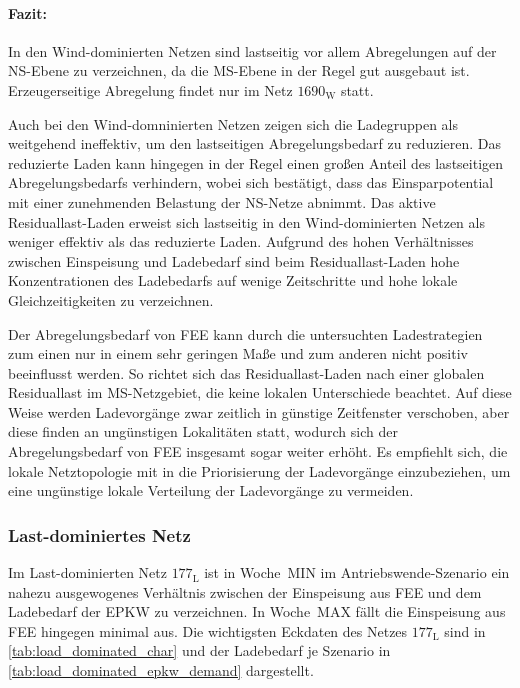 \paragraph{Fazit:}

In den Wind-dominierten Netzen sind lastseitig vor allem Abregelungen auf der \gls{NS}-Ebene zu verzeichnen, da die \gls{MS}-Ebene in der Regel gut ausgebaut ist.
Erzeugerseitige Abregelung findet nur im Netz \(1690_{\text{W}}\) statt.\medskip

Auch bei den Wind-domninierten Netzen zeigen sich die Ladegruppen als weitgehend ineffektiv, um den lastseitigen Abregelungsbedarf zu reduzieren.
Das reduzierte Laden kann hingegen in der Regel einen großen Anteil des lastseitigen Abregelungsbedarfs verhindern, wobei sich bestätigt, dass das Einsparpotential mit einer zunehmenden Belastung der \gls{NS}-Netze abnimmt.
Das aktive Residuallast-Laden erweist sich lastseitig in den Wind-dominierten Netzen als weniger effektiv als das reduzierte Laden.
Aufgrund des hohen Verhältnisses zwischen Einspeisung und Ladebedarf sind beim Residuallast-Laden hohe Konzentrationen des Ladebedarfs auf wenige Zeitschritte und hohe lokale Gleichzeitigkeiten zu verzeichnen.\medskip

Der Abregelungsbedarf von \gls{FEE} kann durch die untersuchten Ladestrategien zum einen nur in einem sehr geringen Maße und zum anderen nicht positiv beeinflusst werden.
So richtet sich das Residuallast-Laden nach einer globalen Residuallast im \gls{MS}-Netzgebiet, die keine lokalen Unterschiede beachtet.
Auf diese Weise werden Ladevorgänge zwar zeitlich in günstige Zeitfenster verschoben, aber diese finden an ungünstigen Lokalitäten statt, wodurch sich der Abregelungsbedarf von \gls{FEE} insgesamt sogar weiter erhöht.
Es empfiehlt sich, die lokale Netztopologie mit in die Priorisierung der Ladevorgänge einzubeziehen, um eine ungünstige lokale Verteilung der Ladevorgänge zu vermeiden.


\subsubsection{Last-dominiertes Netz}

Im Last-dominierten Netz \(177_{\text{L}}\) ist in Woche~MIN im Antriebswende-Szenario ein nahezu ausgewogenes Verhältnis zwischen der Einspeisung aus \gls{FEE} und dem Ladebedarf der \gls{EPKW} zu verzeichnen.
In Woche~MAX fällt die Einspeisung aus \gls{FEE} hingegen minimal aus.
Die wichtigsten Eckdaten des Netzes \(177_{\text{L}}\) sind in \autoref{tab:load_dominated_char} und der Ladebedarf je Szenario in \autoref{tab:load_dominated_epkw_demand} dargestellt.

